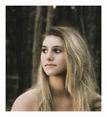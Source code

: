 \documentclass[11pt]{article}
\begin{document}
\begin{figure}[!h]
{\begin{minipage}[t]{0.2\linewidth}
  \includegraphics[width=1\linewidth]{2.jpg}
  \end{minipage}%
  }%
\end{figure}
\end{document}
